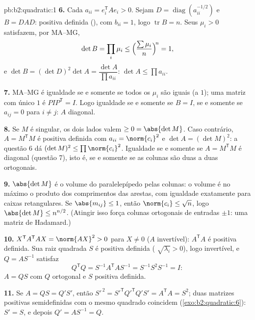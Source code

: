 \begin{solution}{pb:b2:quadratic:1}
\textbf{6.} Cada $a_{ii} = e_i^{\mathsf T}Ae_i > 0$. Sejam $D =
\operatorname{diag}(a_{ii}^{-1/2})$ e $B = DAD$: positiva
definida (), com $b_{ii} = 1$, logo $\operatorname{tr}
B = n$. Seus  $\mu_i > 0$ satisfazem, por MA--MG,
\[
\det B = \prod_i\mu_i
\leq \Bigl(\frac{\sum\mu_i}{n}\Bigr)^{\!n} = 1 ,
\]
e $\det B = (\det D)^2\det A = \dfrac{\det A}{\prod
a_{ii}}$: $\det A \leq \prod a_{ii}$.

\textbf{7.} MA--MG é igualdade se e somente se todos os $\mu_i$ são iguais
(a $1$); uma matriz  com único  $1$ é
$PIP^{\mathsf T} = I$. Logo igualdade se e somente se $B = I$, se e somente se $a_{ij} = 0$
para $i \neq j$: $A$ diagonal.

\textbf{8.} Se $M$ é singular, os dois lados valem $\geq 0 =
\abs{\det M}$. Caso contrário, $A = M^{\mathsf T}M$ é positiva
definida com $a_{ii} = \norm{c_i}^2$ e $\det A = (\det
M)^2$: a questão 6 dá $(\det M)^2 \leq \prod\norm{c_i}^2$.
Igualdade se e somente se $A = M^{\mathsf T}M$ é diagonal (questão 7),
isto é, se e somente se as colunas são duas a duas ortogonais.

\textbf{9.} $\abs{\det M}$ é o volume do paralelepípedo
 pelas colunas: o volume é no máximo o produto dos
comprimentos das arestas, com igualdade exatamente para caixas retangulares.
Se $\abs{m_{ij}} \leq 1$, então $\norm{c_i} \leq \sqrt n$, logo
$\abs{\det M} \leq n^{n/2}$. (Atingir isso força colunas ortogonais
de entradas $\pm1$: uma matriz de Hadamard.)

\textbf{10.} $X^{\mathsf T}A^{\mathsf T}AX = \norm{AX}^2 > 0$
para $X \neq 0$ ($A$ invertível): $A^{\mathsf T}A$ é positiva
definida. Sua raiz quadrada $S$ é positiva definida (
$\sqrt{\lambda_i} > 0$), logo invertível, e $Q = AS^{-1}$
satisfaz
\[
Q^{\mathsf T}Q = S^{-1}A^{\mathsf T}AS^{-1}
= S^{-1}S^2S^{-1} = I :
\]
$A = QS$ com $Q$ ortogonal e $S$ positiva definida.

\textbf{11.} Se $A = QS = Q'S'$, então $S'^{\,2} =
S'^{\mathsf T}Q'^{\mathsf T}Q'S' = A^{\mathsf T}A = S^2$; duas
matrizes positivas semidefinidas com o mesmo quadrado coincidem
(\cref{exo:b2:quadratic:6}): $S' = S$, e depois $Q' = AS^{-1} =
Q$.


\end{solution}

